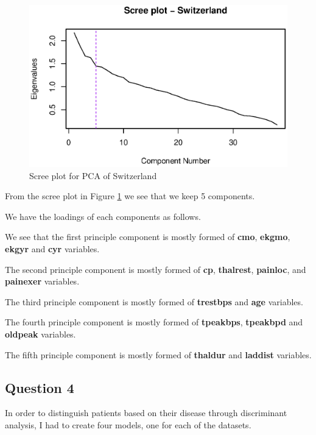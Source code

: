 \documentclass[a4paper]{article}
\begin{document}
\begin{figure}[H]
	\begin{center}
		\includegraphics[width=12cm]{question3output/swiscreeplot.eps}
	\end{center}
	\caption{Scree plot for PCA of Switzerland}
	\label{q3-swi-screeplot}
\end{figure}

From the scree plot in Figure \ref{q3-swi-screeplot} we see that we keep 5 components.

We have the loadings of each components as follows.



We see that the first principle component is mostly formed of \textbf{cmo}, \textbf{ekgmo}, \textbf{ekgyr} and \textbf{cyr} variables.

The second principle component is mostly formed of \textbf{cp}, \textbf{thalrest}, \textbf{painloc}, and \textbf{painexer} variables.

The third principle component is mostly formed of \textbf{trestbps} and \textbf{age} variables.

The fourth principle component is mostly formed of \textbf{tpeakbps}, \textbf{tpeakbpd} and \textbf{oldpeak} variables.

The fifth principle component is mostly formed of \textbf{thaldur} and \textbf{laddist} variables.

\newpage
\subsection{Question 4}

In order to distinguish patients based on their disease through discriminant
analysis, I had to create four models, one for each of the datasets.
\end{document}
